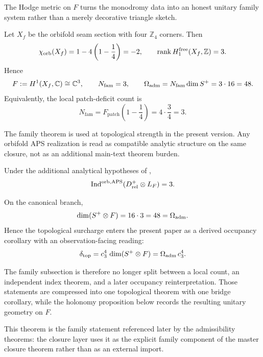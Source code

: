 The Hodge metric on $F$ turns the monodromy data into an honest unitary family system rather than a merely decorative triangle sketch.

\begin{theorem}
\label{thm:topological-family-closure}
\label{thm:orbifold-aps-family-master}
Let $X_f$ be the orbifold seam section with four $\mathbb Z_4$ corners. Then
\[
\chi_{\mathrm{orb}}(X_f)=1-4\left(1-\frac14\right)=-2,
\qquad
\operatorname{rank} H^{\mathrm{free}}_1(X_f,\mathbb Z)=3.
\]
Hence
\[
F:=H^1(X_f,\mathbb C)\cong \mathbb C^3,
\qquad
N_{\mathrm{fam}}=3,
\qquad
\Omega_{\mathrm{adm}}=N_{\mathrm{fam}}\dim S^+=3\cdot 16=48.
\]
Equivalently, the local patch-deficit count is
\[
N_{\mathrm{fam}}=F_{\mathrm{patch}}\!\left(1-\frac14\right)=4\cdot\frac34=3.
\]
\end{theorem}

\begin{remark}
The family theorem is used at topological strength in the present version. Any orbifold APS
realization is read as compatible analytic structure on the same closure, not as an additional
main-text theorem burden.
\end{remark}

\begin{proposition}
\label{prop:orbifold-aps-compatibility}
Under the additional analytical hypotheses of ,
\[
\operatorname{Ind}^{\mathrm{orb,APS}}(D_{\mathrm{rel}}^+\otimes L_F)=3.
\]
\end{proposition}

\begin{corollary}
\label{cor:boundary-bulk-occupancy}
On the canonical branch,
\[
\dim(S^+\otimes F)=16\cdot 3=48=\Omega_{\mathrm{adm}}.
\]
Hence the topological surcharge enters the present paper as a derived occupancy corollary with an
observation-facing reading:
\[
\delta_{\mathrm{top}}
=
c_3^4\,\dim(S^+\otimes F)
=
\Omega_{\mathrm{adm}}\,c_3^4.
\]
\end{corollary}

The family subsection is therefore no longer split between a local count, an independent index theorem, and a later occupancy reinterpretation. Those statements are compressed into one topological theorem with one bridge corollary, while the holonomy proposition below records the resulting unitary geometry on $F$.

This theorem is the family statement referenced later by the admissibility theorems: the closure layer uses it as the explicit family component of the master closure theorem rather than as an external import.

